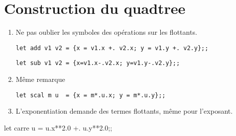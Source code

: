 \section{Construction du quadtree}
\begin{Exercise}[title=Opérations élémentaires]
\renewcommand{\labelenumi}{\alph{enumi})}
\begin{enumerate}
   \itemsep6mm 
    \item Ne pas oublier les symboles des opérations sur les flottants.
\begin{lstlisting}
let add v1 v2 = {x = v1.x +. v2.x; y = v1.y +. v2.y};;
\end{lstlisting}

\begin{lstlisting}
let sub v1 v2 = {x=v1.x-.v2.x; y=v1.y-.v2.y};;
\end{lstlisting}
    \item Même remarque
\begin{lstlisting}
let scal m u  = {x = m*.u.x; y = m*.u.y};;
\end{lstlisting}
    \item L'exponentiation demande des termes flottants, même pour l'exposant.
\end{enumerate}
let carre u   = u.x**2.0 +. u.y**2.0;;
\end{Exercise}
